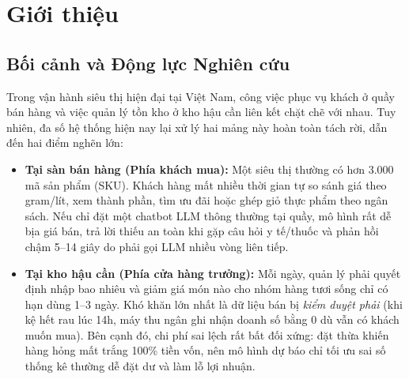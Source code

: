\chapter{Giới thiệu}

\section{Bối cảnh và Động lực Nghiên cứu}

Trong vận hành siêu thị hiện đại tại Việt Nam, công việc phục vụ khách ở quầy bán hàng và việc quản lý tồn kho ở kho hậu cần liên kết chặt chẽ với nhau. Tuy nhiên, đa số hệ thống hiện nay lại xử lý hai mảng này hoàn toàn tách rời, dẫn đến hai điểm nghẽn lớn:
\begin{itemize}
    \item \textbf{Tại sàn bán hàng (Phía khách mua):} Một siêu thị thường có hơn 3.000 mã sản phẩm (SKU). Khách hàng mất nhiều thời gian tự so sánh giá theo gram/lít, xem thành phần, tìm ưu đãi hoặc ghép giỏ thực phẩm theo ngân sách. Nếu chỉ đặt một chatbot LLM thông thường tại quầy, mô hình rất dễ bịa giá bán, trả lời thiếu an toàn khi gặp câu hỏi y tế/thuốc và phản hồi chậm 5--14 giây do phải gọi LLM nhiều vòng liên tiếp.
    \item \textbf{Tại kho hậu cần (Phía cửa hàng trưởng):} Mỗi ngày, quản lý phải quyết định nhập bao nhiêu và giảm giá món nào cho nhóm hàng tươi sống chỉ có hạn dùng 1--3 ngày. Khó khăn lớn nhất là dữ liệu bán bị \emph{kiểm duyệt phải} (khi kệ hết rau lúc 14h, máy thu ngân ghi nhận doanh số bằng 0 dù vẫn có khách muốn mua). Bên cạnh đó, chi phí sai lệch rất bất đối xứng: đặt thừa khiến hàng hỏng mất trắng 100\% tiền vốn, nên mô hình dự báo chỉ tối ưu sai số thống kê thường dễ đặt dư và làm lỗ lợi nhuận.
\end{itemize}


